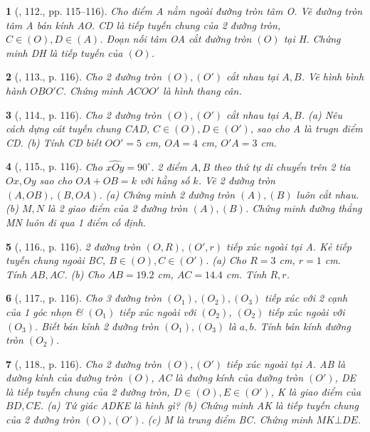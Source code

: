 \documentclass{article}
\newtheorem{baitoan}{}
\begin{document}
\begin{baitoan}[\cite{Binh_Toan_9_tap_1}, 112., pp. 115--116]
	Cho điểm A nằm ngoài đường tròn tâm O. Vẽ đường tròn tâm A bán kính AO. CD là tiếp tuyến chung của 2 đường tròn, $C\in(O),D\in(A)$. Đoạn nối tâm OA cắt đường tròn $(O)$ tại H. Chứng minh DH là tiếp tuyến của $(O)$.
\end{baitoan}

\begin{baitoan}[\cite{Binh_Toan_9_tap_1}, 113., p. 116]
	Cho 2 đường tròn $(O),(O')$ cắt nhau tại $A,B$. Vẽ hình bình hành $OBO'C$. Chứng minh $ACOO'$ là hình thang cân.
\end{baitoan}

\begin{baitoan}[\cite{Binh_Toan_9_tap_1}, 114., p. 116]
	Cho 2 đường tròn $(O),(O')$ cắt nhau tại $A,B$. (a) Nêu cách dựng cát tuyến chung CAD, $C\in(O),D\in(O')$, sao cho A là trugn điểm CD. (b) Tính CD biết $OO' = 5$ {\rm cm}, $OA = 4$ {\rm cm}, $O'A = 3$ {\rm cm}.
\end{baitoan}

\begin{baitoan}[\cite{Binh_Toan_9_tap_1}, 115., p. 116]
	Cho $\widehat{xOy} = 90^\circ$. 2 điểm $A,B$ theo thứ tự di chuyển trên 2 tia $Ox,Oy$ sao cho $OA + OB = k$ với hằng số $k$. Vẽ 2 đường tròn $(A,OB),(B,OA)$. (a) Chứng minh 2 đường tròn $(A),(B)$ luôn cắt nhau. (b) $M,N$ là 2 giao điểm của 2 đường tròn $(A),(B)$. Chứng minh đường thẳng MN luôn đi qua 1 điểm cố định.
\end{baitoan}

\begin{baitoan}[\cite{Binh_Toan_9_tap_1}, 116., p. 116]
	2 đường tròn $(O,R),(O',r)$ tiếp xúc ngoài tại A. Kẻ tiếp tuyến chung ngoài BC, $B\in(O),C\in(O')$. (a) Cho $R = 3$ {\rm cm}, $r = 1$ {\rm cm}. Tính $AB,AC$. (b) Cho $AB = 19.2$ {\rm cm}, $AC = 14.4$ {\rm cm}. Tính $R,r$.
\end{baitoan}

\begin{baitoan}[\cite{Binh_Toan_9_tap_1}, 117., p. 116]
	Cho 3 đường tròn $(O_1),(O_2),(O_3)$ tiếp xúc với 2 cạnh của 1 góc nhọn \& $(O_1)$ tiếp xúc ngoài với $(O_2)$, $(O_2)$ tiếp xúc ngoài với $(O_3)$. Biết bán kính 2 đường tròn $(O_1),(O_3)$ là $a,b$. Tính bán kính đường tròn $(O_2)$.
\end{baitoan}

\begin{baitoan}[\cite{Binh_Toan_9_tap_1}, 118., p. 116]
	Cho 2 đường tròn $(O),(O')$ tiếp xúc ngoài tại A. AB là đường kính của đường tròn $(O)$, AC là đường kính của đường tròn $(O')$, DE là tiếp tuyến chung của 2 đường tròn, $D\in(O),E\in(O')$, K là giao điểm của $BD,CE$. (a) Tứ giác ADKE là hình gì? (b) Chứng minh AK là tiếp tuyến chung của 2 đường tròn $(O),(O')$. (c) M là trung điểm BC. Chứng minh $MK\bot DE$.
\end{baitoan}
\end{document}

